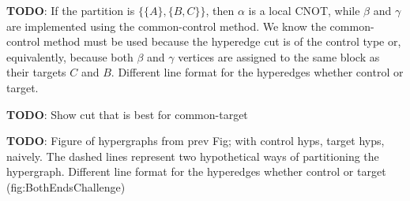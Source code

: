 \textbf{TODO}: If the partition is \(\{\{A\},\{B,C\}\}\), then \(\alpha\) is a local CNOT, while \(\beta\) and \(\gamma\) are implemented using the common-control method. We know the common-control method must be used because the hyperedge cut is of the control type or, equivalently, because both \(\beta\) and \(\gamma\) vertices are assigned to the same block as their targets \(C\) and \(B\). Different line format for the hyperedges whether control or target.

\textbf{TODO}: Show cut that is best for common-target

\textbf{TODO}: Figure of hypergraphs from prev Fig; with control hyps, target hyps, naively. The dashed lines represent two hypothetical ways of partitioning the hypergraph. Different line format for the hyperedges whether control or target (fig:BothEndsChallenge)